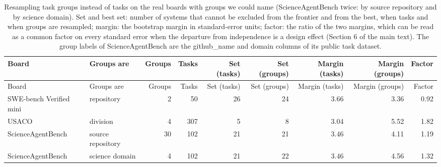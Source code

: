 \begin{longtable}{lp{2.6cm}rrrrrrr}
\caption{Resampling task groups instead of tasks on the real boards with groups we could name (ScienceAgentBench twice: by source repository and by science domain). Set and best set: number of systems that cannot be excluded from the frontier and from the best, when tasks and when groups are resampled; margin: the bootstrap margin in standard-error units; factor: the ratio of the two margins, which can be read as a common factor on every standard error when the departure from independence is a design effect (Section 6 of the main text). The group labels of ScienceAgentBench are the github\_name and domain columns of its public task dataset.}\label{tab:supp-cluster}\\
\toprule
Board & Groups are & Groups & Tasks & Set (tasks) & Set (groups) & Margin (tasks) & Margin (groups) & Factor \\
\midrule
\endfirsthead
\toprule
Board & Groups are & Groups & Tasks & Set (tasks) & Set (groups) & Margin (tasks) & Margin (groups) & Factor \\
\midrule
\endhead
\bottomrule
\endfoot
SWE-bench Verified mini & repository & 2 & 50 & 26 & 24 & 3.66 & 3.36 & 0.92 \\
USACO & division & 4 & 307 & 5 & 8 & 3.04 & 5.52 & 1.82 \\
ScienceAgentBench & source repository & 30 & 102 & 21 & 21 & 3.46 & 4.11 & 1.19 \\
ScienceAgentBench & science domain & 4 & 102 & 21 & 22 & 3.46 & 4.56 & 1.32 \\
\end{longtable}
